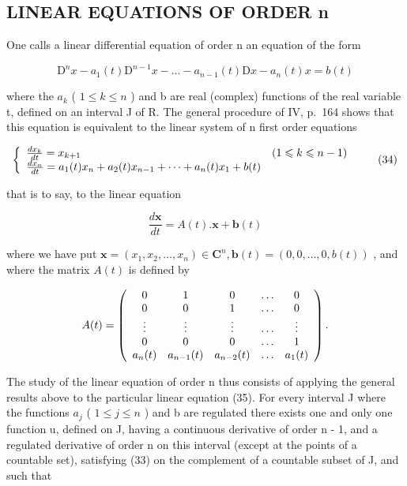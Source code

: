 \subsection{LINEAR EQUATIONS OF ORDER n}

One calls a linear differential equation of order n an equation of the form

\[
\mathrm{D} ^ {n} x - a _ {1} (t) \mathrm{D} ^ {n - 1} x - \dots - a _ {n - 1} (t) \mathrm{D} x - a _ {n} (t) x = b (t)\tag{33}
\]

where the \(a_{k}\) ( \(1 \leqslant k \leqslant n\) ) and b are real (complex) functions of the real variable t, defined on an interval J of R. The general procedure of IV, p.~164 shows that this equation is equivalent to the linear system of n first order equations

\[
\left\{ \begin{array}{l l} \frac {d x _ {k}}{d t} = x _ {k + 1} & (1 \leqslant k \leqslant n - 1) \\ \frac {d x _ {n}}{d t} = a _ {1} (t) x _ {n} + a _ {2} (t) x _ {n - 1} + \dots + a _ {n} (t) x _ {1} + b (t) \end{array} \right.\tag{34}
\]

that is to say, to the linear equation

\[
\frac {d \mathbf {x}}{d t} = A (t). \mathbf {x} + \mathbf {b} (t)\tag{35}
\]

where we have put \(\mathbf{x}=(x_{1},x_{2},\ldots,x_{n})\in\mathbf{C}^{n},\mathbf{b}(t)=(0,0,\ldots,0,b(t))\) , and where the matrix \(A(t)\) is defined by

\[
A (t) = \left( \begin{array}{c c c c c} 0 & 1 & 0 & \ldots & 0 \\ 0 & 0 & 1 & \ldots & 0 \\ \vdots & \vdots & \vdots & \ldots & \vdots \\ 0 & 0 & 0 & \ldots & 1 \\ a _ {n} (t) & a _ {n - 1} (t) & a _ {n - 2} (t) & \ldots & a _ {1} (t) \end{array} \right).
\]

The study of the linear equation of order n thus consists of applying the general results above to the particular linear equation (35). For every interval J where the functions \(a_{j}\) ( \(1 \leqslant j \leqslant n\) ) and b are regulated there exists one and only one function u, defined on J, having a continuous derivative of order n - 1, and a regulated derivative of order n on this interval (except at the points of a countable set), satisfying (33) on the complement of a countable subset of J, and such that

